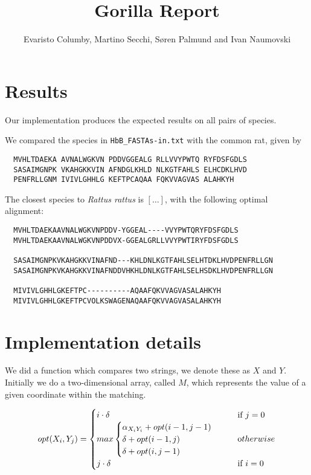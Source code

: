 \documentclass{tufte-handout}
\title{Gorilla Report}
\author{Evaristo Columby, Martino Secchi, Søren Palmund and Ivan Naumovski}
\begin{document}
  \maketitle

  \section{Results}

  Our implementation produces the expected results on all pairs of species.

  We compared the species in \verb!HbB_FASTAs-in.txt!
  with the common rat, given by

  \begin{verbatim}
  MVHLTDAEKA AVNALWGKVN PDDVGGEALG RLLVVYPWTQ RYFDSFGDLS
  SASAIMGNPK VKAHGKKVIN AFNDGLKHLD NLKGTFAHLS ELHCDKLHVD
  PENFRLLGNM IVIVLGHHLG KEFTPCAQAA FQKVVAGVAS ALAHKYH
  \end{verbatim}

  The closest species to \emph{Rattus rattus} is $[\ldots]$, with the following optimal alignment:

\medskip
  \begin{fullwidth}\small
  \begin{verbatim}
  MVHLTDAEKAAVNALWGKVNPDDV-YGGEAL----VVYPWTQRYFDSFGDLS
  MVHLTDAEKAAVNALWGKVNPDDVX-GGEALGRLLVVYPWTIRYFDSFGDLS

  SASAIMGNPKVKAHGKKVINAFND---KHLDNLKGTFAHLSELHTDKLHVDPENFRLLGN
  SASAIMGNPKVKAHGKKVINAFNDDVHKHLDNLKGTFAHLSELHSDKLHVDPENFRLLGN

  MIVIVLGHHLGKEFTPC----------AQAAFQKVVAGVASALAHKYH
  MIVIVLGHHLGKEFTPCVOLKSWAGENAQAAFQKVVAGVASALAHKYH
  \end{verbatim}
\end{fullwidth}



  \section{Implementation details}
We did a function which compares two strings, we denote these as $X$ and  $Y$.
Initially we do a two-dimensional array, called $M$, which represents the value of a given coordinate within the matching.

\begin{equation}
    opt(X_i, Y_j) = 
    \begin{cases}
    	i\cdot\delta       			& \quad \text{if } j = 0\\
        max 	\begin{cases}	 
        \alpha_{X_i Y_i} + opt(i-1, j-1)\\
        \delta + opt(i-1, j)\\
        \delta + opt(i, j-1)\\
\end{cases}				& \quad \text otherwise \\
        j\cdot\delta	& \quad \text{if } i = 0  \\
    \end{cases}
\end{equation}\newline
\end{document}
